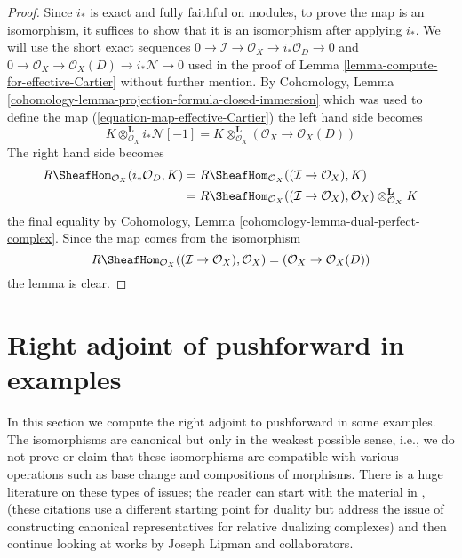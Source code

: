 \begin{proof}
Since $i_*$ is exact and fully faithful on modules, to prove the map is an
isomorphism, it suffices to show that it is an isomorphism after applying
$i_*$. We will use the short exact sequences
$0 \to \mathcal{I} \to \mathcal{O}_X \to i_*\mathcal{O}_D \to 0$
and
$0 \to \mathcal{O}_X \to \mathcal{O}_X(D) \to i_*\mathcal{N} \to 0$
used in the proof of Lemma \ref{lemma-compute-for-effective-Cartier}
without further mention. By
Cohomology, Lemma \ref{cohomology-lemma-projection-formula-closed-immersion}
which was used to define the map (\ref{equation-map-effective-Cartier})
the left hand side becomes
$$
K \otimes_{\mathcal{O}_X}^\mathbf{L} i_*\mathcal{N}[-1] =
K \otimes_{\mathcal{O}_X}^\mathbf{L} (\mathcal{O}_X \to \mathcal{O}_X(D))
$$
The right hand side becomes
\begin{align*}
R\SheafHom_{\mathcal{O}_X}(i_*\mathcal{O}_D, K) & =
R\SheafHom_{\mathcal{O}_X}((\mathcal{I} \to \mathcal{O}_X), K) \\
& =
R\SheafHom_{\mathcal{O}_X}((\mathcal{I} \to \mathcal{O}_X), \mathcal{O}_X)
\otimes_{\mathcal{O}_X}^\mathbf{L} K
\end{align*}
the final equality by
Cohomology, Lemma \ref{cohomology-lemma-dual-perfect-complex}.
Since the map comes from the isomorphism
$$
R\SheafHom_{\mathcal{O}_X}((\mathcal{I} \to \mathcal{O}_X), \mathcal{O}_X)
= (\mathcal{O}_X \to \mathcal{O}_X(D))
$$
the lemma is clear.
\end{proof}





\section{Right adjoint of pushforward in examples}
\label{section-examples}

\noindent
In this section we compute the right adjoint to pushforward in
some examples. The isomorphisms are canonical but only in the weakest
possible sense, i.e., we do not prove or claim that these isomorphisms are
compatible with various operations such as base change and compositions
of morphisms. There is a huge literature on these types of issues; the reader
can start with the material in \cite{RD}, \cite{Conrad-GD}
(these citations use a different starting point for duality but address the
issue of constructing canonical representatives for relative dualizing
complexes) and then continue looking at works by
Joseph Lipman and collaborators.

